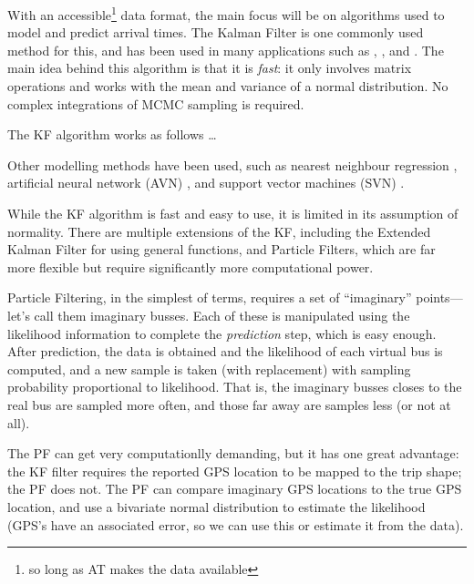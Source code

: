 \documentclass[12pt,a4paper]{article}
\begin{document}
With an accessible\footnote{so long as AT makes the data available} data format, the main focus will be on algorithms
used to model and predict arrival times. The Kalman Filter is one commonly used method for this, and has been used
in many applications such as \cite{cathey-dailey:2003}, \cite{cn}, and \cite{cn}.
The main idea behind this algorithm is that it is \emph{fast}: it only involves matrix operations and works with 
the mean and variance of a normal distribution.
No complex integrations of MCMC sampling is required.


The KF algorithm works as follows \ldots

Other modelling methods have been used, such as
nearest neighbour regression \citep{chang-etal:2010},
artificial neural network (AVN) \citep{jeong-rilett:2005}, and
support vector machines (SVN) \citep{yu-etal:2006,yu-etal:2010,yu-etal:2011}.

While the KF algorithm is fast and easy to use, it is limited in its assumption of normality. 
There are multiple extensions of the KF, including the Extended Kalman Filter for using general functions, 
and Particle Filters, which are far more flexible but require significantly more computational power.

Particle Filtering, in the simplest of terms, requires a set of ``imaginary'' points---let's call them imaginary busses.
Each of these is manipulated using the likelihood information to complete the \emph{prediction} step,
which is easy enough.
After prediction, the data is obtained and the likelihood of each virtual bus is computed,
and a new sample is taken (with replacement) with sampling probability proportional to likelihood.
That is, the imaginary busses closes to the real bus are sampled more often, 
and those far away are samples less (or not at all).

The PF can get very computationlly demanding, but it has one great advantage:
the KF filter requires the reported GPS location to be mapped to the trip shape;
the PF does not.
The PF can compare imaginary GPS locations to the true GPS location, and use a bivariate normal distribution
to estimate the likelihood (GPS's have an associated error, so we can use this or estimate it from the data).












\end{document}
